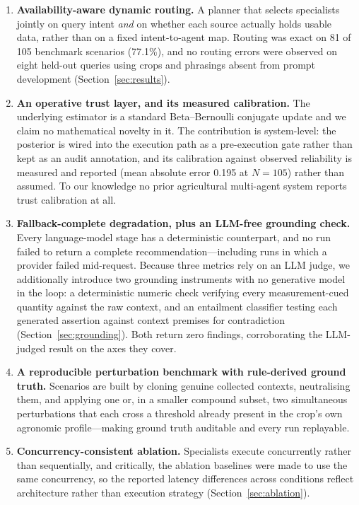 \documentclass[preprint,12pt]{elsarticle}
\begin{document}
\begin{enumerate}
\item \textbf{Availability-aware dynamic routing.} A planner that selects
specialists jointly on query intent \emph{and} on whether each source
actually holds usable data, rather than on a fixed intent-to-agent map.
Routing was exact on 81 of 105 benchmark scenarios (77.1\%), and no
routing errors were observed on eight held-out queries using crops and
phrasings absent from prompt development (Section~\ref{sec:results}).

\item \textbf{An operative trust layer, and its measured calibration.}
The underlying estimator is a standard Beta--Bernoulli conjugate update
and we claim no mathematical novelty in it. The contribution is
system-level: the posterior is wired into the execution path as a
pre-execution gate rather than kept as an audit annotation, and its
calibration against observed reliability is measured and reported
(mean absolute error 0.195 at $N=105$) rather than assumed. To our knowledge no
prior agricultural multi-agent system reports trust calibration at
all.

\item \textbf{Fallback-complete degradation, plus an LLM-free grounding
check.} Every language-model stage has a deterministic counterpart, and no
run failed to return a complete recommendation---including runs in which a
provider failed mid-request. Because three metrics rely on an LLM judge, we
additionally introduce two grounding instruments with no generative model
in the loop: a deterministic numeric check verifying every
measurement-cued quantity against the raw context, and an entailment
classifier testing each generated assertion against context premises for
contradiction (Section~\ref{sec:grounding}). Both return zero findings,
corroborating the LLM-judged result on the axes they cover.

\item \textbf{A reproducible perturbation benchmark with rule-derived ground
truth.} Scenarios are built by cloning genuine collected contexts,
neutralising them, and applying one or, in a smaller compound subset,
two simultaneous perturbations that each cross a threshold already
present in the crop's own agronomic profile---making ground truth
auditable and every run replayable.

\item \textbf{Concurrency-consistent ablation.} Specialists execute
concurrently rather than sequentially, and critically, the
ablation baselines were made to use the same concurrency, so the reported
latency differences across conditions reflect architecture rather than
execution strategy (Section~\ref{sec:ablation}).
\end{enumerate}
\end{document}
